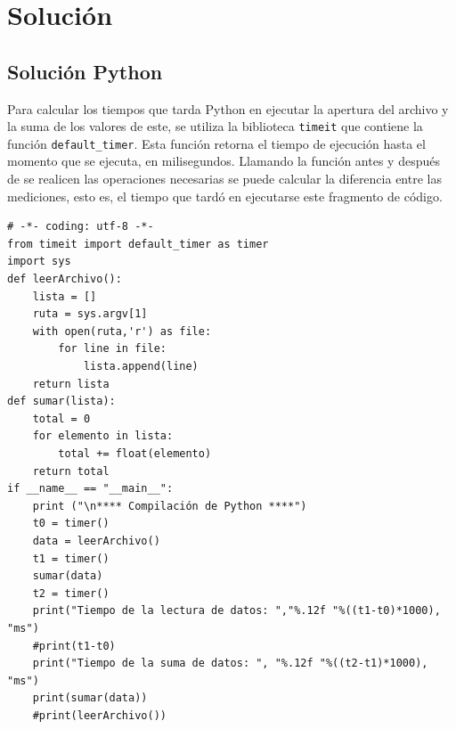 
 


\section{Solución}
\subsection{Solución Python}
Para calcular los tiempos que tarda Python en ejecutar la apertura del archivo y la suma de los valores de este, se utiliza la biblioteca \texttt{timeit} que contiene la función \texttt{default\_timer}. Esta función retorna el tiempo de ejecución hasta el momento que se ejecuta, en milisegundos. Llamando la función antes y después de se realicen las operaciones necesarias se puede calcular la diferencia entre las mediciones, esto es, el tiempo que tardó en ejecutarse este fragmento de código.
\begin{verbatim}
# -*- coding: utf-8 -*-
from timeit import default_timer as timer
import sys
def leerArchivo():
	lista = []
	ruta = sys.argv[1]
	with open(ruta,'r') as file:
		for line in file:
			lista.append(line)
	return lista
def sumar(lista):
	total = 0
	for elemento in lista:
		total += float(elemento)
	return total
if __name__ == "__main__":
	print ("\n**** Compilación de Python ****")
	t0 = timer()
	data = leerArchivo()
	t1 = timer()
	sumar(data)
	t2 = timer()
	print("Tiempo de la lectura de datos: ","%.12f "%((t1-t0)*1000), "ms")
	#print(t1-t0)
	print("Tiempo de la suma de datos: ", "%.12f "%((t2-t1)*1000), "ms")
	print(sumar(data))
	#print(leerArchivo())

\end{verbatim}


